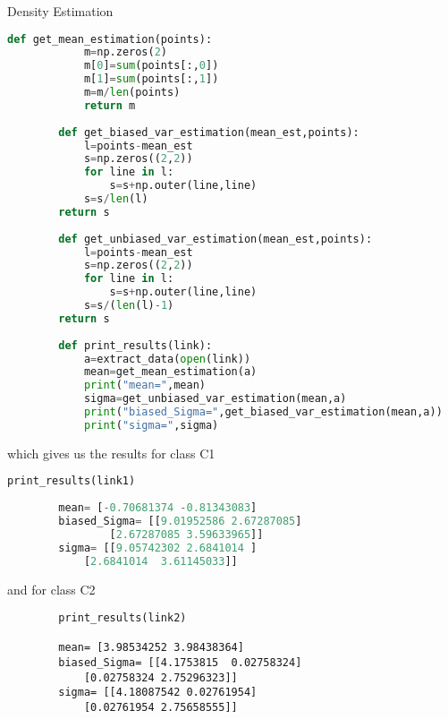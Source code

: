 \documentclass[
ngerman,
]{tudaexercise}
\begin{document}
\begin{task}{Density Estimation}
\begin{subtask}
\begin{lstlisting}[language=Python]
		def get_mean_estimation(points):
			m=np.zeros(2)
			m[0]=sum(points[:,0])
			m[1]=sum(points[:,1])
			m=m/len(points)
			return m
		
		def get_biased_var_estimation(mean_est,points):
			l=points-mean_est
			s=np.zeros((2,2))
			for line in l:
				s=s+np.outer(line,line)
			s=s/len(l)
		return s
		
		def get_unbiased_var_estimation(mean_est,points):
			l=points-mean_est
			s=np.zeros((2,2))
			for line in l:
				s=s+np.outer(line,line)
			s=s/(len(l)-1)
		return s
		
		def print_results(link):
			a=extract_data(open(link))
			mean=get_mean_estimation(a)
			print("mean=",mean)
			sigma=get_unbiased_var_estimation(mean,a)
			print("biased_Sigma=",get_biased_var_estimation(mean,a))
			print("sigma=",sigma)
		\end{lstlisting}
		which gives us the results for class C1
		\begin{lstlisting}[language=Python]
		print_results(link1)
		
		mean= [-0.70681374 -0.81343083]
		biased_Sigma= [[9.01952586 2.67287085]
				[2.67287085 3.59633965]]
		sigma= [[9.05742302 2.6841014 ]
			[2.6841014  3.61145033]]
		\end{lstlisting}
		and for class C2
		\begin{lstlisting}
		print_results(link2)
		
		mean= [3.98534252 3.98438364]
		biased_Sigma= [[4.1753815  0.02758324]
			[0.02758324 2.75296323]]
		sigma= [[4.18087542 0.02761954]
			[0.02761954 2.75658555]]
		\end{lstlisting}
	\end{subtask}
	\end{task}
	
\end{document}
